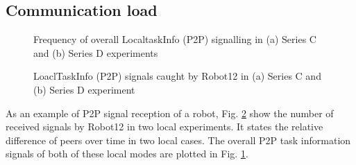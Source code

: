 \subsection*{Communication load}
\begin{figure}
\centering
{}
\caption{\small Frequency of overall LocaltaskInfo (P2P) signalling in (a) Series C and (b) Series D experiments}
\label{fig:local-signal-frequency-stat} %
\end{figure}
%
\begin{figure}
\centering
{}
\caption{\small LoaclTaskInfo (P2P) signals caught by Robot12 in (a) Series C and (b) Series D experiment}
\label{fig:local-single-robot-signal} 
\end{figure}
As an example of P2P signal reception of a robot,  Fig. \ref{fig:local-single-robot-signal} show the number of received signals by Robot12 in two local experiments. It states the relative difference of peers over time in two local cases. The overall P2P task information signals of both of these local modes are plotted in Fig. \ref{fig:local-signal-frequency-stat}. 
